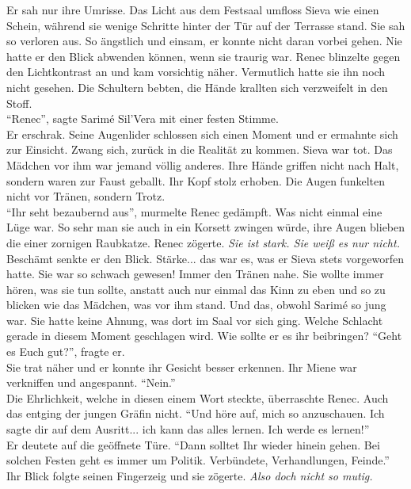 Er sah nur ihre Umrisse. Das Licht aus dem Festsaal umfloss Sieva wie einen Schein, während sie 
wenige Schritte hinter der Tür auf der Terrasse stand. Sie sah so verloren aus. So ängstlich und 
einsam, er konnte nicht daran vorbei gehen. Nie hatte er den Blick abwenden können, wenn sie traurig 
war. Renec blinzelte gegen den Lichtkontrast an und kam vorsichtig näher. Vermutlich hatte sie ihn 
noch nicht gesehen.  Die Schultern bebten, die Hände krallten sich verzweifelt in den Stoff. \\
``Renec'', sagte Sarimé Sil'Vera mit einer festen Stimme.\\
Er erschrak. Seine Augenlider schlossen sich einen Moment und er ermahnte sich zur Einsicht. 
Zwang sich, zurück in die Realität zu kommen. Sieva war tot. Das Mädchen vor ihm war jemand völlig 
anderes. Ihre Hände griffen nicht nach Halt, sondern waren zur Faust geballt. Ihr Kopf stolz 
erhoben. Die Augen funkelten nicht vor Tränen, sondern Trotz. \\
``Ihr seht bezaubernd aus'', murmelte Renec gedämpft. Was nicht einmal eine Lüge war. So sehr man 
sie auch in ein Korsett zwingen würde, ihre Augen blieben die einer zornigen Raubkatze. Renec 
zögerte. \textit{Sie ist stark. Sie weiß es nur nicht.}\\
Beschämt senkte er den Blick. Stärke... das war es, was er Sieva stets vorgeworfen hatte. Sie war 
so schwach gewesen! Immer den Tränen nahe. Sie wollte immer hören, was sie tun sollte, anstatt auch 
nur einmal das Kinn zu eben und so zu blicken wie das Mädchen, was vor ihm stand. Und das, obwohl 
Sarimé so jung war. Sie hatte keine Ahnung, was dort im Saal vor sich ging. Welche Schlacht gerade 
in diesem Moment geschlagen wird. Wie sollte er es ihr beibringen? ``Geht es Euch gut?'', fragte 
er.\\
Sie trat näher und er konnte ihr Gesicht besser erkennen. Ihr Miene war verkniffen und angespannt.
``Nein.''\\
Die Ehrlichkeit, welche in diesen einem Wort steckte, überraschte Renec. Auch das entging der 
jungen Gräfin nicht. ``Und höre auf, mich so anzuschauen. Ich sagte dir auf dem Ausritt... ich kann 
das alles lernen. Ich werde es lernen!''\\
Er deutete auf die geöffnete Türe. ``Dann solltet Ihr wieder hinein gehen. Bei solchen Festen geht 
es immer um Politik. Verbündete, Verhandlungen, Feinde.''\\
Ihr Blick folgte seinen Fingerzeig und sie zögerte.
\textit{Also doch nicht so mutig.}\\
